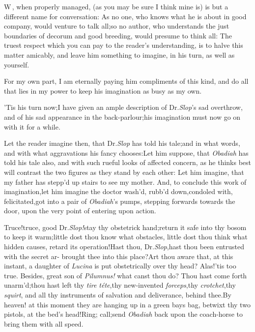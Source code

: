 \documentclass{article}
\begin{document}
\lettrine{W}{\,}, when properly managed, (as
you may be sure I think mine is) is but a different name for
conversation: As no one, who knows what he is about in good
company, would venture to talk all;\tsk so no author, who
understands the just boundaries of decorum and good breeding, would
presume to think all: The truest respect which you can pay to the
reader’s understanding, is to halve this matter amicably, and
leave him something to imagine, in his turn,\break
as well as yourself.

For my own part, I am eternally paying him compliments of this
kind, and do all that lies in my power to keep his\break
imagination as busy as my own.

\newpage
’Tis his turn now;\tsk I have given an ample description of Dr.\@ \textit{Slop}’s sad
overthrow, and of his sad appearance in the back-parlour;\tsk his
imagination must now go on with it for a while.

Let the reader imagine then, that Dr.\@ \textit{Slop} has told his
tale;\tsk and in what words, and with what aggravations his fancy
chooses:\tsk Let him suppose, that \textit{Obadiah} has told his
tale also, and with such rueful looks of affected concern, as he
thinks best will contrast the two\break
figures as they stand by each other:\tsk\break
Let him imagine, that my father has\break
stepp’d up stairs to see my mother.\tsk\break 
And, to conclude this work of imagination,\tsk let him
imagine the doctor wash’d,\break
\tsk rubb’d down,\tsk condoled with,\tsk\break
felicitated,\tsk got into a pair of \textit{Obadiah}’s\break
pumps, stepping forwards towards the\pb
door, upon the very point of entering\break
upon action.

Truce!\tsk truce, good Dr.\@ \textit{Slop!}\tsk stay thy
obstetrick hand;\tsk return it safe into thy bosom to keep
it warm;\tsk little dost thou know what obstacles,\tsk
little dost thou think what hidden causes, retard its
operation!\tsk Hast thou, Dr.\@ \textit{Slop},\tsk hast thou
been entrusted with the secret ar-\break
{} 
brought thee into this place?\tsk Art thou aware
that, at this instant, a daughter of \textit{Lucina} is put
obstetrically over thy head?\break
Alas!\tsk ’tis too true.\tsk
Besides, great son of \textit{Pilumnus!} what canst thou
do?\tsh\break
Thou hast come forth unarm’d;\tsk thou hast left thy
\textit{tire téte},\tsk thy new-invented
\textit{forceps},\tsk thy \textit{crotchet},\tsk thy
\textit{squirt}, and all thy instruments of salvation and
deliverance, behind thee.\tsk By heaven!\pb
at this moment they are hanging up in a green bays bag,
betwixt thy two pistols, at the bed’s head!\tsk Ring;\tsk
call;\tsk send \textit{Obadiah} back upon the coach-horse to
bring them with all speed.
\end{document}
